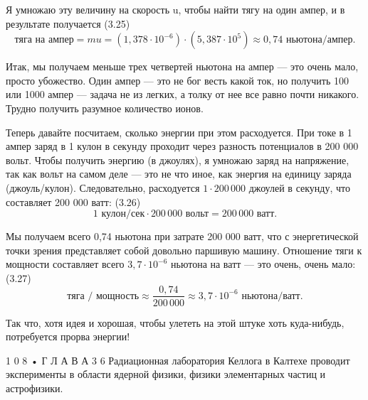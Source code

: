 \documentclass[10pt,oneside]{article}
\newcommand{\TipsSubsection}[1]{\par\vspace{6bp}{\normalsize\bfseries #1\par}\vspace{2bp}}
\begin{document}
Я умножаю эту величину на скорость u, чтобы найти тягу на один ампер, и в результате получается (3.25) \[\text{тяга на ампер} = mu = (1{,}378 \cdot 10^{-6}) \cdot (5{,}387 \cdot 10^{5}) \approx 0{,}74\text{ ньютона/ампер}.\]\par

Итак, мы получаем меньше трех четвертей ньютона на ампер --- это очень мало, просто убожество. Один ампер --- это не бог весть какой ток, но получить 100 или 1000 ампер --- задача не из легких, а толку от нее все равно почти никакого. Трудно получить разумное количество ионов.\par

Теперь давайте посчитаем, сколько энергии при этом расходуется. При токе в 1 ампер заряд в 1 кулон в секунду проходит через разность потенциалов в 200 000 вольт. Чтобы получить энергию (в джоулях), я умножаю заряд на напряжение, так как вольт на самом деле --- это не что иное, как энергия на единицу заряда (джоуль/кулон). Следовательно, расходуется \(1 \cdot 200\,000\) джоулей в секунду, что составляет 200 000 ватт: (3.26) \[1\text{ кулон/сек} \cdot 200\,000\text{ вольт} = 200\,000\text{ ватт}.\]\par

Мы получаем всего 0,74 ньютона при затрате 200 000 ватт, что с энергетической точки зрения представляет собой довольно паршивую машину. Отношение тяги к мощности составляет всего \(3{,}7 \cdot 10^{-6}\) ньютона на ватт --- это очень, очень мало: (3.27) \[\text{тяга / мощность} \approx \frac{0{,}74}{200\,000} \approx 3{,}7 \cdot 10^{-6}\text{ ньютона/ватт}.\]\par

Так что, хотя идея и хорошая, чтобы улететь на этой штуке хоть куда-нибудь, потребуется прорва энергии!\par

1 0 8 • Г Л А В А  3 6 Радиационная лаборатория Келлога в Калтехе проводит эксперименты в области ядерной физики, физики элементарных частиц и астрофизики.\par

\TipsSubsection{3-8 Электростатический отклонитель протонного пучка Следующая задача, которую я придумал, чтобы показать, на что вы способны, такова. В Лаборатории Келлога6 у нас есть генератор Ван де Граафа, ускоряющий протоны до напряжения 2 миллиона вольт. Разность потенциалов создается электростатически с помощью движущейся ленты. Протоны проходят через этот потенциал, приобретают большую энергию и вылетают в виде пучка.}
\end{document}
